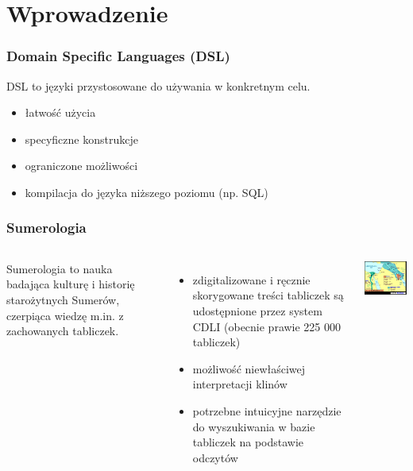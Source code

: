 \section{Wprowadzenie}

\begin{frame}
     \frametitle{Domain Specific Languages (DSL)}
     
     DSL to języki przystosowane do używania w konkretnym celu.
     \begin{itemize}
          \item
          łatwość użycia
          \item
          specyficzne konstrukcje
          \item 
          ograniczone możliwości
          \item
          kompilacja do języka niższego poziomu (np. SQL)
     \end{itemize}


\end{frame}



\begin{frame}
\frametitle{Sumerologia}
\begin{columns}
Sumerologia to nauka badająca kulturę i historię starożytnych Sumerów, czerpiąca wiedzę m.in. z zachowanych tabliczek.
\begin{itemize}
\item zdigitalizowane i ręcznie skorygowane treści tabliczek są udostępnione przez system CDLI (obecnie prawie 225 000 tabliczek)
\item możliwość niewłaściwej interpretacji klinów
\item potrzebne intuicyjne narzędzie do wyszukiwania w bazie tabliczek na podstawie odczytów
\end{itemize} 
\includegraphics[width=55mm]{../1/sum_map.png}
\end{columns}
\end{frame}


